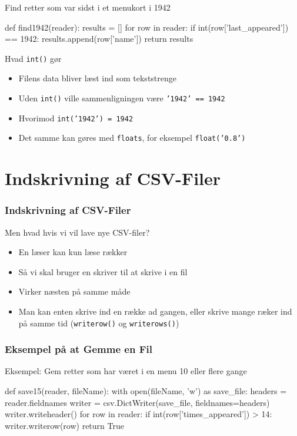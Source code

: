 \documentclass[aspectratio=169,12pt,t]{beamer}
\begin{document}
\begin{frame}[fragile]
  \vspace*{-11pt}
    \begin{block}{Find retter som var sidst i et menukort i 1942}
    \begin{python}
def find1942(reader):
    results = []
    for row in reader:
        if int(row['last_appeared']) == 1942:
            results.append(row['name'])
    return results
    \end{python}
  \end{block}
\begin{block}{Hvad {\tt int()} gør}
  \begin{itemize}
    \item Filens data bliver læst ind som tekststrenge
    \item Uden {\tt int()} ville sammenligningen være {\tt '1942' == 1942}
    \item Hvorimod {\tt int('1942') = 1942}
    \item Det samme kan gøres med {\tt floats}, for eksempel {\tt float('0.8')} 
  \end{itemize}
\end{block}
\end{frame}

\section{Indskrivning af CSV-Filer}
\begin{frame}[fragile]
  \frametitle{Indskrivning af CSV-Filer}
  \begin{block}{Men hvad hvis vi vil lave nye CSV-filer?}
    \begin{itemize}
      \item En læser kan kun læse rækker
      \item Så vi skal bruger en skriver til at skrive i en fil
      \item Virker næsten på samme måde
      \item Man kan enten skrive ind en række ad gangen, eller skrive mange 
            ræker ind på samme tid ({\tt writerow()} og {\tt writerows()})
    \end{itemize}
  \end{block}
\end{frame}
\begin{frame}[fragile]
  \frametitle{Eksempel på at Gemme en Fil}
  \begin{block}{Eksempel: Gem retter som har været i en menu 10 eller flere gange}
    \begin{python}
def save15(reader, fileName):
    with open(fileName, 'w') as save_file:
        headers = reader.fieldnames
        writer = csv.DictWriter(save_file, 
                                fieldnames=headers)
        writer.writeheader()
        for row in reader:
            if int(row['times_appeared']) > 14:
                writer.writerow(row)
    return True 
    \end{python}
  \end{block}
\end{frame}
\end{document}
